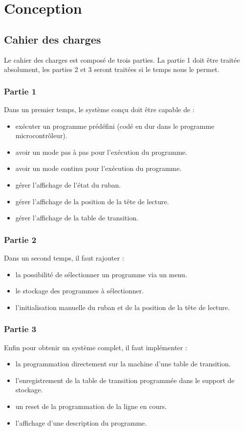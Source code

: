 \documentclass[12pt]{report}
\begin{document}
	 \section{Conception}
	 \subsection{Cahier des charges}
	 Le cahier des charges est composé de trois parties. La partie 1 doit être traitée absolument, les parties 2 et 3 seront traitées si le temps nous le permet.
	 \subsubsection{Partie 1}
	 Dans un premier temps, le système conçu doit être capable de :
	 \begin{itemize}[label=$-$]
	 	\item exécuter un programme prédéfini (codé en dur dans le programme microcontrôleur).
	 	\item avoir un mode pas à pas pour l'exécution du programme.
	 	\item avoir un mode continu pour l'exécution du programme.
	 	\item gérer l'affichage de l'état du ruban.
	 	\item gérer l'affichage de la position de la tête de lecture.
	 	\item gérer l'affichage de la table de transition.
	 \end{itemize}
	 \subsubsection{Partie 2}
	 Dans un second temps, il faut rajouter :
	 \begin{itemize}[label=$-$]
	 	\item  la possibilité de sélectionner un programme via un menu.
	 	\item le stockage des programmes à sélectionner.
	 	\item l'initialisation manuelle du ruban et de la position de la tête de lecture.
	 \end{itemize}
	 \subsubsection{Partie 3}
	 Enfin pour obtenir un système complet, il faut implémenter :
	 \begin{itemize}[label=$-$]
	 	\item la programmation directement sur la machine d'une table de transition.
	 	\item l'enregistrement de la table de transition programmée dans le support de stockage.
	 	\item un reset de la programmation de la ligne en cours.
	 	\item l'affichage d'une description du programme.
	 \end{itemize}
\end{document}
